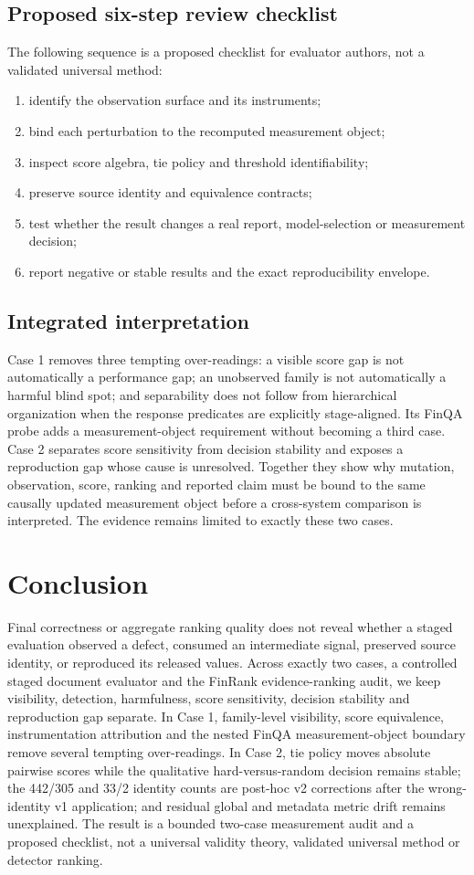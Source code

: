 \documentclass[10pt,conference]{IEEEtran}
\begin{document}
\subsection{Proposed six-step review checklist}
The following sequence is a proposed checklist for evaluator authors, not a validated universal method:
\begin{enumerate}
\item identify the observation surface and its instruments;
\item bind each perturbation to the recomputed measurement object;
\item inspect score algebra, tie policy and threshold identifiability;
\item preserve source identity and equivalence contracts;
\item test whether the result changes a real report, model-selection or measurement decision;
\item report negative or stable results and the exact reproducibility envelope.
\end{enumerate}
\subsection{Integrated interpretation}
Case 1 removes three tempting over-readings: a visible score gap is not automatically a performance gap; an unobserved family is not automatically a harmful blind spot; and separability does not follow from hierarchical organization when the response predicates are explicitly stage-aligned. Its FinQA probe adds a measurement-object requirement without becoming a third case. Case 2 separates score sensitivity from decision stability and exposes a reproduction gap whose cause is unresolved. Together they show why mutation, observation, score, ranking and reported claim must be bound to the same causally updated measurement object before a cross-system comparison is interpreted. The evidence remains limited to exactly these two cases.
\section{Conclusion}
Final correctness or aggregate ranking quality does not reveal whether a staged evaluation observed a defect, consumed an intermediate signal, preserved source identity, or reproduced its released values. Across exactly two cases, a controlled staged document evaluator and the FinRank evidence-ranking audit, we keep visibility, detection, harmfulness, score sensitivity, decision stability and reproduction gap separate. In Case 1, family-level visibility, score equivalence, instrumentation attribution and the nested FinQA measurement-object boundary remove several tempting over-readings. In Case 2, tie policy moves absolute pairwise scores while the qualitative hard-versus-random decision remains stable; the 442/305 and 33/2 identity counts are post-hoc v2 corrections after the wrong-identity v1 application; and residual global and metadata metric drift remains unexplained. The result is a bounded two-case measurement audit and a proposed checklist, not a universal validity theory, validated universal method or detector ranking.
\end{document}

